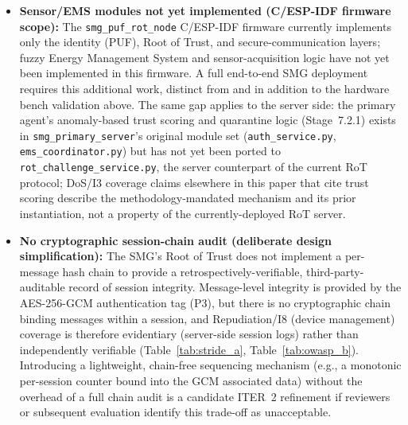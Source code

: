 \documentclass[preprint,12pt,authoryear]{elsarticle}
\begin{document}
\begin{sloppypar}
\begin{itemize}[leftmargin=*]
    \item \textbf{Sensor/EMS modules not yet implemented (C/ESP-IDF firmware scope):} The \texttt{smg\_puf\_rot\_node} C/ESP-IDF firmware currently implements only the identity (PUF), Root of Trust, and secure-communication layers; fuzzy Energy Management System and sensor-acquisition logic have not yet been implemented in this firmware. A full end-to-end SMG deployment requires this additional work, distinct from and in addition to the hardware bench validation above. The same gap applies to the server side: the primary agent's anomaly-based trust scoring and quarantine logic (Stage~7.2.1) exists in \texttt{smg\_primary\_server}'s original module set (\texttt{auth\_service.py}, \texttt{ems\_coordinator.py}) but has not yet been ported to \texttt{rot\_challenge\_service.py}, the server counterpart of the current RoT protocol; DoS/I3 coverage claims elsewhere in this paper that cite trust scoring describe the methodology-mandated mechanism and its prior instantiation, not a property of the currently-deployed RoT server.
    \item \textbf{No cryptographic session-chain audit (deliberate design simplification):} The SMG's Root of Trust does not implement a per-message hash chain to provide a retrospectively-verifiable, third-party-auditable record of session integrity. Message-level integrity is provided by the AES-256-GCM authentication tag (P3), but there is no cryptographic chain binding messages within a session, and Repudiation/I8 (device management) coverage is therefore evidentiary (server-side session logs) rather than independently verifiable (Table~\ref{tab:stride_a}, Table~\ref{tab:owasp_b}). Introducing a lightweight, chain-free sequencing mechanism (e.g., a monotonic per-session counter bound into the GCM associated data) without the overhead of a full chain audit is a candidate ITER~2 refinement if reviewers or subsequent evaluation identify this trade-off as unacceptable.

\end{itemize}
\end{sloppypar}
\end{document}
